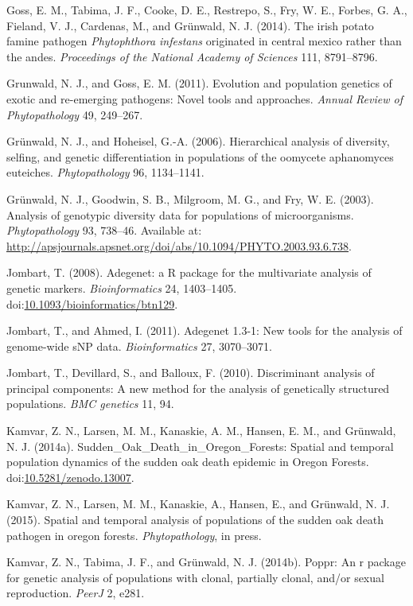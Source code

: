 \documentclass{frontiersSCNS} %
\begin{document}
Goss, E. M., Tabima, J. F., Cooke, D. E., Restrepo, S., Fry, W. E.,
Forbes, G. A., Fieland, V. J., Cardenas, M., and Gr{ü}nwald, N. J.
(2014). The irish potato famine pathogen \emph{Phytophthora infestans}
originated in central mexico rather than the andes. \emph{Proceedings of
the National Academy of Sciences} 111, 8791--8796.

Grunwald, N. J., and Goss, E. M. (2011). Evolution and population
genetics of exotic and re-emerging pathogens: Novel tools and
approaches. \emph{Annual Review of Phytopathology} 49, 249--267.

Gr{ü}nwald, N. J., and Hoheisel, G.-A. (2006). Hierarchical analysis of
diversity, selfing, and genetic differentiation in populations of the
oomycete aphanomyces euteiches. \emph{Phytopathology} 96, 1134--1141.

Grünwald, N. J., Goodwin, S. B., Milgroom, M. G., and Fry, W. E. (2003).
Analysis of genotypic diversity data for populations of microorganisms.
\emph{Phytopathology} 93, 738--46. Available at:
\url{http://apsjournals.apsnet.org/doi/abs/10.1094/PHYTO.2003.93.6.738}.

Jombart, T. (2008). Adegenet: a R package for the multivariate analysis
of genetic markers. \emph{Bioinformatics} 24, 1403--1405.
doi:\href{http://dx.doi.org/10.1093/bioinformatics/btn129}{10.1093/bioinformatics/btn129}.

Jombart, T., and Ahmed, I. (2011). Adegenet 1.3-1: New tools for the
analysis of genome-wide sNP data. \emph{Bioinformatics} 27, 3070--3071.

Jombart, T., Devillard, S., and Balloux, F. (2010). Discriminant
analysis of principal components: A new method for the analysis of
genetically structured populations. \emph{BMC genetics} 11, 94.

Kamvar, Z. N., Larsen, M. M., Kanaskie, A. M., Hansen, E. M., and
Grünwald, N. J. (2014a). Sudden\_Oak\_Death\_in\_Oregon\_Forests:
Spatial and temporal population dynamics of the sudden oak death
epidemic in Oregon Forests.
doi:\href{http://dx.doi.org/10.5281/zenodo.13007}{10.5281/zenodo.13007}.

Kamvar, Z. N., Larsen, M. M., Kanaskie, A., Hansen, E., and Grünwald, N.
J. (2015). Spatial and temporal analysis of populations of the sudden
oak death pathogen in oregon forests. \emph{Phytopathology}, in press.

Kamvar, Z. N., Tabima, J. F., and Gr{ü}nwald, N. J. (2014b). Poppr: An r
package for genetic analysis of populations with clonal, partially
clonal, and/or sexual reproduction. \emph{PeerJ} 2, e281.
\end{document}
